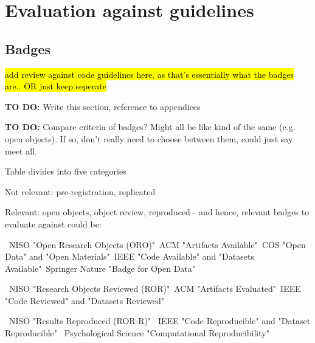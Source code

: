 \section{Evaluation against guidelines}

\subsection{Badges}
\timeno

\hl{add review against code guidelines here, as that's essentially what the badges are.. OR just keep seperate}


\textbf{TO DO:} Write this section, reference to appendices

\textbf{TO DO:} Compare criteria of badges? Might all be like kind of the same (e.g. open objects). If so, don't really need to choose between them, could just say meet all.

Table divides into five categories

Not relevant: pre-registration, replicated

Relevant: open objects, object review, reproduced - and hence, relevant badges to evaluate against could be:

\textbullet\ NISO "Open Research Objects (ORO)"\newline \textbullet\ ACM "Artifacts Available"\newline \textbullet\ COS "Open Data" and "Open Materials"\newline \textbullet\ IEEE "Code Available" and "Datasets Available"\newline \textbullet\ Springer Nature "Badge for Open Data"

\textbullet\ NISO "Research Objects Reviewed (ROR)"\newline \textbullet\ ACM "Artifacts Evaluated"\newline \textbullet\ IEEE "Code Reviewed" and "Datasets Reviewed"

\textbullet\ NISO "Results Reproduced (ROR-R)" \newline \textbullet\ IEEE "Code Reproducible" and "Dataset Reproducible" \newline \textbullet\ Psychological Science "Computational Reproducibility"

